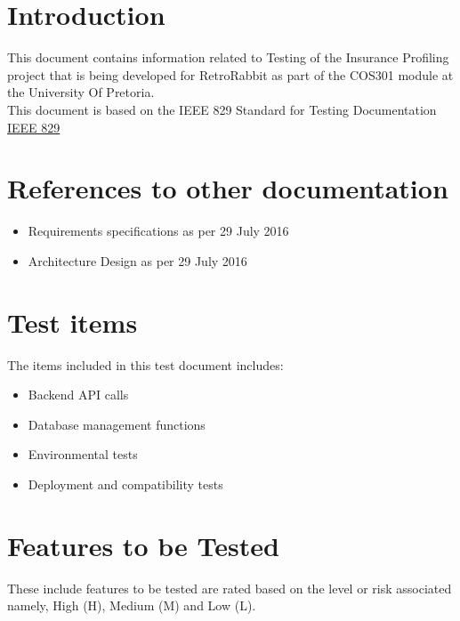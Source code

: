 \documentclass{article}
\begin{document}
\section{Introduction}
This document contains information related to Testing of the Insurance Profiling project that is being developed for RetroRabbit as part of the COS301 module at the University Of Pretoria. \\
This document is based on the IEEE 829 Standard for Testing Documentation \href{http://www.fit.vutbr.cz/study/courses/ITS/public/ieee829.html}{IEEE 829}

\section{References to other documentation}
\begin{itemize}
	\item{Requirements specifications as per 29 July 2016}
	\item{Architecture Design as per 29 July 2016}
\end{itemize}

\section{Test items}
The items included in this test document includes:
\begin{itemize}
	\item Backend API calls
	\item Database management functions
	\item Environmental tests 
	\item Deployment and compatibility tests
\end{itemize} 

\section{Features to be Tested}
These include features to be tested are rated based on the level or risk associated namely, High (H), Medium (M) and Low (L).
\end{document}
